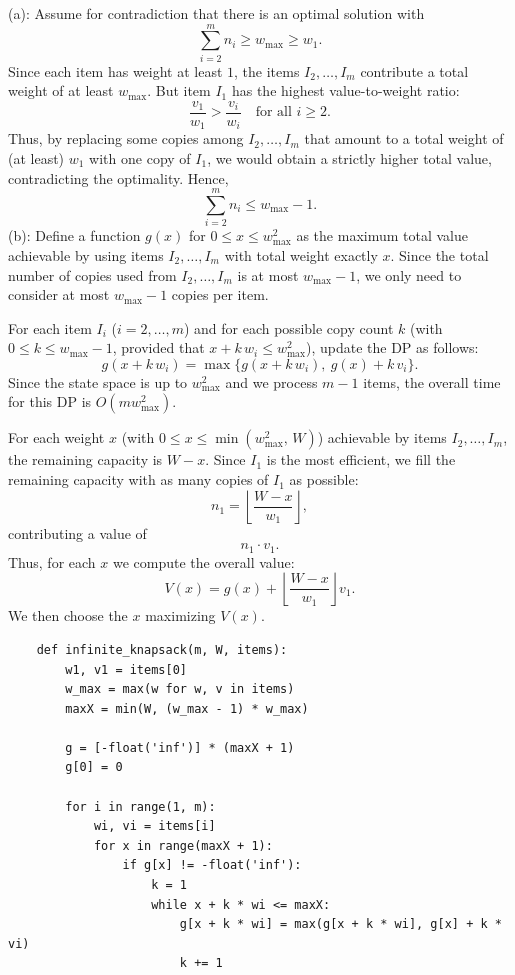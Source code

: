 \documentclass[letterpaper, 11pt]{article}
\newcommand{\1}{\mathds{1}}	%
\theoremstyle{definition}
\newenvironment{solution}{{\par\noindent\it Solution.}}{}
\begin{document}
\begin{solution}
(a):
Assume for contradiction that there is an optimal solution with
\[
\sum_{i=2}^m n_i \ge w_{\max} \geq w_1.
\]
Since each item has weight at least \(1\), the items \(I_2,\dots,I_m\) contribute a total weight of at least \(w_{\max}\). But item \(I_1\) has the highest value-to-weight ratio:
\[
\frac{v_1}{w_1}>\frac{v_i}{w_i}\quad\text{for all } i\ge 2.
\]
Thus, by replacing some copies among \(I_2,\dots,I_m\) that amount to a total weight of (at least) \(w_1\) with one copy of \(I_1\), we would obtain a strictly higher total value, contradicting the optimality. Hence, 
\[
\sum_{i=2}^m n_i\le w_{\max}-1.
\]
(b):
Define a function \(g(x)\) for \(0\le x\le w_{\max}^2\) as the maximum total value achievable by using items \(I_2,\dots,I_m\) with total weight exactly \(x\). Since the total number of copies used from \(I_2,\dots,I_m\) is at most \(w_{\max}-1\), we only need to consider at most \(w_{\max}-1\) copies per item.

For each item \(I_i\) (\(i=2,\dots,m\)) and for each possible copy count \(k\) (with \(0\le k\le w_{\max}-1\), provided that \(x + k\,w_i \le w_{\max}^2\)), update the DP as follows:
\[
g(x+k\,w_i) = \max\{ g(x+k\,w_i),\ g(x) + k\,v_i \}.
\]
Since the state space is up to \(w_{\max}^2\) and we process \(m-1\) items, the overall time for this DP is \(O(mw_{\max}^2)\).


For each weight \(x\) (with \(0\le x\le \min(w_{\max}^2,\,W)\)) achievable by items \(I_2,\dots,I_m\), the remaining capacity is \(W-x\). Since \(I_1\) is the most efficient, we fill the remaining capacity with as many copies of \(I_1\) as possible:
\[
n_1 = \left\lfloor \frac{W-x}{w_1} \right\rfloor,
\]
contributing a value of
\[
n_1\cdot v_1.
\]
Thus, for each \(x\) we compute the overall value:
\[
V(x) = g(x) + \left\lfloor \frac{W-x}{w_1} \right\rfloor v_1.
\]
We then choose the \(x\) maximizing \(V(x)\).
\begin{lstlisting}
    def infinite_knapsack(m, W, items):
        w1, v1 = items[0]
        w_max = max(w for w, v in items)
        maxX = min(W, (w_max - 1) * w_max)
        
        g = [-float('inf')] * (maxX + 1)
        g[0] = 0
        
        for i in range(1, m):
            wi, vi = items[i]
            for x in range(maxX + 1):
                if g[x] != -float('inf'):
                    k = 1
                    while x + k * wi <= maxX:
                        g[x + k * wi] = max(g[x + k * wi], g[x] + k * vi)
                        k += 1
                        

\end{lstlisting}
\end{solution}
\end{document}
